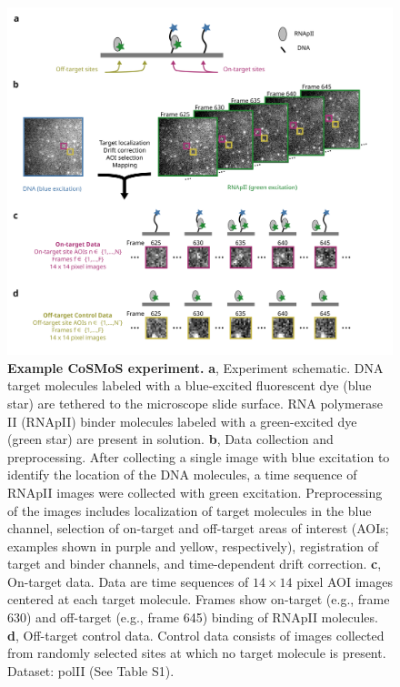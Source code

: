 \renewcommand{\figurename}{Fig.}

\begin{figure}[t]
\centering
\includegraphics[width=183mm]{figures/figure1/figure1.png}
\caption{\textbf{Example CoSMoS experiment.} \textbf{a}, Experiment schematic. DNA target molecules labeled with a blue-excited fluorescent dye (blue star) are tethered to the microscope slide surface. RNA polymerase II (RNApII) binder molecules labeled with a green-excited dye (green star) are present in solution. \textbf{b}, Data collection and preprocessing. After collecting a single image with blue excitation to identify the location of the DNA molecules, a time sequence of RNApII images were collected with green excitation.  Preprocessing of the images includes localization of target molecules in the blue channel, selection of on-target and off-target areas of interest (AOIs; examples shown in purple and yellow, respectively), registration of target and binder channels, and time-dependent drift correction. \textbf{c}, On-target data. Data are time sequences of $14 \times 14$ pixel AOI images centered at each target molecule. Frames show on-target (e.g., frame 630) and off-target (e.g., frame 645) binding of RNApII molecules. \textbf{d}, Off-target control data. Control data consists of images collected from randomly selected sites at which no target molecule is present. Dataset: polII (See Table S1). }
\label{fig:cosmos_experiment}
\end{figure}


